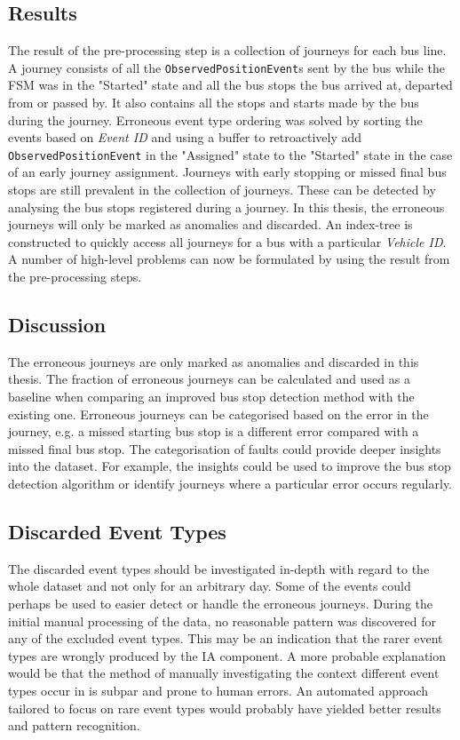 \subsection{Results}
The result of the pre-processing step is a collection of journeys for each bus line.
A journey consists of all the \texttt{ObservedPositionEvent}s sent by the bus while the FSM was in the "Started" state and all the bus stops the bus arrived at, departed from or passed by.
It also contains all the stops and starts made by the bus during the journey.
Erroneous event type ordering was solved by sorting the events based on \textit{Event ID} and using a buffer to retroactively add \texttt{ObservedPositionEvent} in the "Assigned" state to the "Started" state in the case of an early journey assignment.
Journeys with early stopping or missed final bus stops are still prevalent in the collection of journeys.
These can be detected by analysing the bus stops registered during a journey.
In this thesis, the erroneous journeys will only be marked as anomalies and discarded.
An index-tree is constructed to quickly access all journeys for a bus with a particular \textit{Vehicle ID}.
A number of high-level problems can now be formulated by using the result from the pre-processing steps.

\subsection{Discussion}
The erroneous journeys are only marked as anomalies and discarded in this thesis.
The fraction of erroneous journeys can be calculated and used as a baseline when comparing an improved bus stop detection method with the existing one.
Erroneous journeys can be categorised based on the error in the journey, e.g. a missed starting bus stop is a different error compared with a missed final bus stop.
The categorisation of faults could provide deeper insights into the dataset.
For example, the insights could be used to improve the bus stop detection algorithm or identify journeys where a particular error occurs regularly.

\subsection{Discarded Event Types}
The discarded event types should be investigated in-depth with regard to the whole dataset and not only for an arbitrary day.
Some of the events could perhaps be used to easier detect or handle the erroneous journeys.
During the initial manual processing of the data, no reasonable pattern was discovered for any of the excluded event types.
This may be an indication that the rarer event types are wrongly produced by the IA component.
A more probable explanation would be that the method of manually investigating the context different event types occur in is subpar and prone to human errors.
An automated approach tailored to focus on rare event types would probably have yielded better results and pattern recognition.

